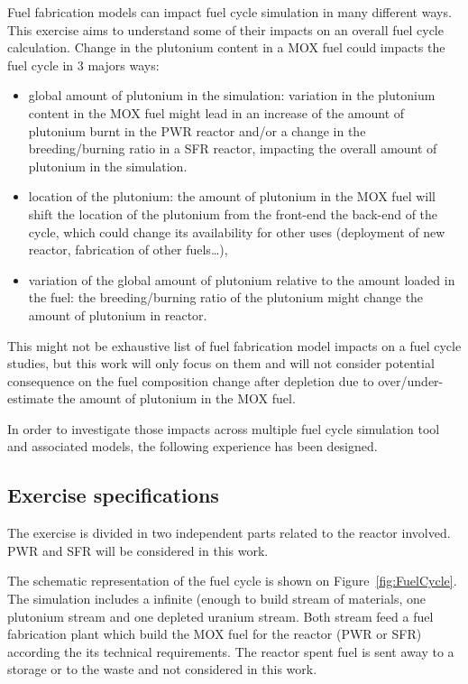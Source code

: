 Fuel fabrication models can impact fuel cycle simulation in many different ways.
This exercise aims to understand some of their impacts on an overall fuel cycle
calculation. Change in the plutonium content in a \gls{MOX} fuel could impacts
the fuel cycle in 3 majors ways:

\begin{itemize}
    \item global amount of plutonium in the simulation: variation in the
        plutonium content in the \gls{MOX} fuel might lead in an increase of the
        amount of plutonium burnt in the \gls{PWR} reactor and/or a change in the
        breeding/burning ratio in a \gls{SFR} reactor, impacting the overall amount of
        plutonium in the simulation.
    \item location of the plutonium: the amount of plutonium in the \gls{MOX}
        fuel will shift the location of the plutonium from the front-end the
        back-end of the cycle, which could change its availability for other
        uses (deployment of new reactor, fabrication of other fuels\ldots),
    \item variation of the global amount of plutonium relative to the amount
        loaded in the fuel: the breeding/burning ratio of the plutonium might
        change the amount of plutonium in reactor.
\end{itemize}

This might not be exhaustive list of fuel fabrication model impacts on a fuel
cycle studies, but this work will only focus on them and will not consider
potential consequence on the fuel composition change after depletion due to
over/under-estimate the amount of plutonium in the \gls{MOX} fuel.

In order to investigate those impacts across multiple fuel cycle simulation tool
and associated models, the following experience has been designed.

\subsection{Exercise specifications}

The exercise is divided in two independent parts related to the reactor
involved. \gls{PWR} and \gls{SFR} will be considered in this work.

The schematic representation of the fuel cycle is shown on
Figure~\ref{fig:FuelCycle}. The simulation includes a infinite (enough to build
stream of materials, one plutonium stream and one depleted uranium stream. Both
stream feed a fuel fabrication plant which build the MOX fuel for the reactor
(\gls{PWR}  or \gls{SFR}) according the its technical requirements. The reactor
spent fuel is sent away to a storage or to the waste and not considered in
this work.

